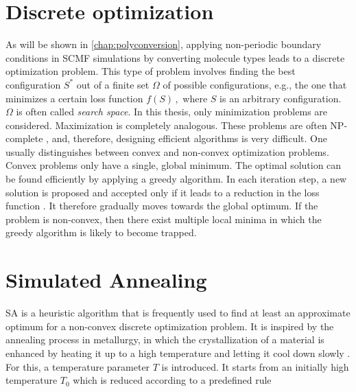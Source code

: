 \documentclass[bachelor,       %
               oneside,        %
               BCOR10mm,       %
               ngerman, english %
               ]{GAUBM}
\begin{document}



\section{Discrete optimization}

As will be shown in \autoref{chap:polyconversion}, applying non-periodic boundary conditions in \ac{SCMF} simulations by converting molecule types leads to a discrete optimization problem. This type of problem involves finding the best configuration $S^*$ out of a finite set $\Omega$ of possible configurations, e.g., the one that minimizes a certain loss function $f(S)\,,$ where $S$ is an arbitrary configuration. $\Omega$ is often called \textit{search space}. In this thesis, only minimization problems are considered. Maximization is completely analogous. These problems are often NP-complete \cite{gary1979computers}, and, therefore, designing efficient algorithms is very difficult. One usually distinguishes between convex and non-convex optimization problems. Convex problems only have a single, global minimum. The optimal solution can be found efficiently by applying a greedy algorithm. In each iteration step, a new solution is proposed and accepted only if it leads to a reduction in the loss function \cite{cormen01introduction}. It therefore gradually moves towards the global optimum. If the problem is non-convex, then there exist multiple local minima in which the greedy algorithm is likely to become trapped. 

\section{Simulated Annealing}
\label{sec:sa}
\ac{SA} \cite{simulated_annealing} is a heuristic algorithm that is frequently used to find at least an approximate optimum for a non-convex discrete optimization problem. It is inspired by the annealing process in metallurgy, in which the crystallization of a material is enhanced by heating it up to a high temperature and letting it cool down slowly \cite{sa_applications}. For this, a temperature parameter $T$ is introduced. It starts from an initially high temperature $T_0$ which is reduced according to a predefined rule
\end{document}
